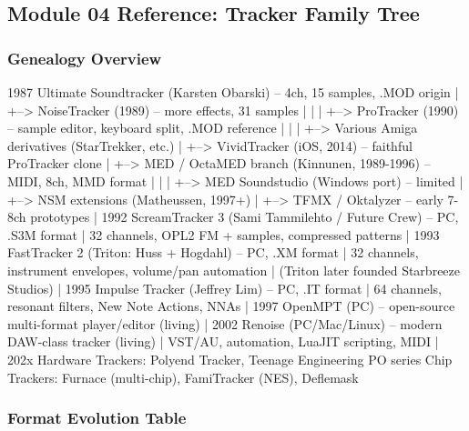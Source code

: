 \documentclass[11pt,letterpaper]{article}
\begin{document}
\subsection{Module 04 Reference: Tracker Family Tree}

\subsubsection{Genealogy Overview}

\begin{asciibox}
1987  Ultimate Soundtracker (Karsten Obarski) -- 4ch, 15 samples, .MOD origin
       |
       +--> NoiseTracker (1989) -- more effects, 31 samples
       |     |
       |     +--> ProTracker (1990) -- sample editor, keyboard split, .MOD reference
       |           |
       |           +--> Various Amiga derivatives (StarTrekker, etc.)
       |           +--> VividTracker (iOS, 2014) -- faithful ProTracker clone
       |
       +--> MED / OctaMED branch (Kinnunen, 1989-1996) -- MIDI, 8ch, MMD format
       |     |
       |     +--> MED Soundstudio (Windows port) -- limited
       |     +--> NSM extensions (Matheussen, 1997+)
       |
       +--> TFMX / Oktalyzer -- early 7-8ch prototypes
       |
1992  ScreamTracker 3 (Sami Tammilehto / Future Crew) -- PC, .S3M format
       |  32 channels, OPL2 FM + samples, compressed patterns
       |
1993  FastTracker 2 (Triton: Huss + Hogdahl) -- PC, .XM format
       |  32 channels, instrument envelopes, volume/pan automation
       |  (Triton later founded Starbreeze Studios)
       |
1995  Impulse Tracker (Jeffrey Lim) -- PC, .IT format
       |  64 channels, resonant filters, New Note Actions, NNAs
       |
1997  OpenMPT (PC) -- open-source multi-format player/editor (living)
       |
2002  Renoise (PC/Mac/Linux) -- modern DAW-class tracker (living)
       |  VST/AU, automation, LuaJIT scripting, MIDI
       |
202x  Hardware Trackers: Polyend Tracker, Teenage Engineering PO series
       Chip Trackers: Furnace (multi-chip), FamiTracker (NES), Deflemask
\end{asciibox}

\subsubsection{Format Evolution Table}
\end{document}
